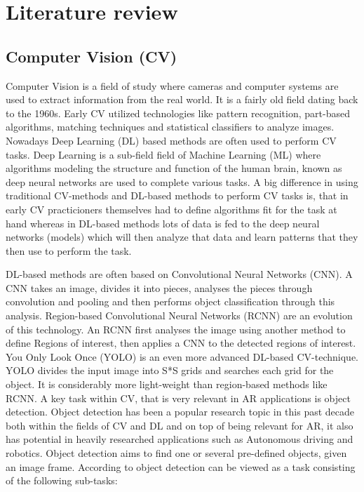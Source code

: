 \chapter{Literature review} \label{Literature review}

\section{Computer Vision (CV)} \label{cv}

Computer Vision is a field of study where cameras and computer systems are 
used to extract information from the real world.\cite{klette2014hv} It is a 
fairly old field dating back to the 1960s. Early CV utilized technologies like 
pattern recognition, part-based algorithms, matching techniques and 
statistical classifiers to analyze images.\cite{ghasemi} Nowadays Deep 
Learning (DL) based methods are often used to perform CV tasks.\cite{ghasemi} 
Deep Learning is a sub-field field of Machine Learning (ML) where algorithms 
modeling the structure and function of the human brain, known as deep neural 
networks are used to complete various tasks.\cite{estrada} A big difference 
in using traditional CV-methods and DL-based methods to perform CV tasks is, 
that in early CV practicioners themselves had to define algorithms fit for 
the task at hand whereas in DL-based methods lots of data is fed to the deep 
neural networks (models) which will then analyze that data and learn patterns 
that they then use to perform the task.\cite{ghasemi}\par
	DL-based methods are often based on Convolutional Neural Networks (CNN).
A CNN takes an image, divides it into pieces, analyses the pieces through 
convolution and pooling and then performs object classification through this 
analysis.\cite{ghasemi} Region-based Convolutional Neural Networks (RCNN) are 
an evolution of this technology. An RCNN first analyses the image using 
another method to define Regions of interest, then applies a CNN to the 
detected regions of interest.\cite{ghasemi}\cite{estrada} You Only Look Once 
(YOLO) is an even more advanced DL-based CV-technique. YOLO divides the input 
image into S*S grids and searches each grid for the object. It is 
considerably more light-weight than region-based methods like 
RCNN.\cite{ghasemi}\cite{estrada}
	A key task within CV, that is very relevant in AR applications is 
object detection. Object detection has been a popular research topic in this 
past decade both within the fields of CV and DL and on top of being relevant 
for AR, it also has potential in heavily researched applications such as 
Autonomous driving and robotics.\cite{estrada}\cite{ghasemi} Object detection 
aims to find one or several pre-defined objects, given an image 
frame.\cite{ghasemi} According to \textcite{ghasemi} object detection can be 
viewed as a task consisting of the following sub-tasks:

